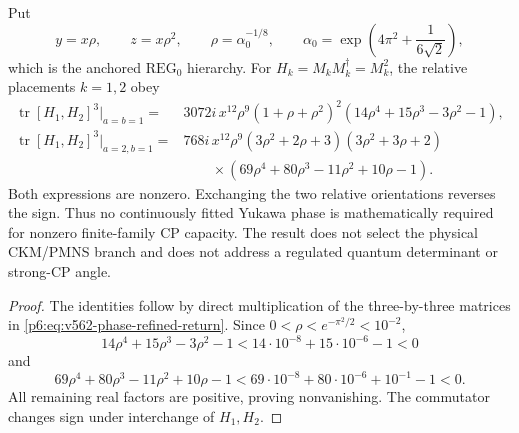 \documentclass[11pt,a4paper]{article}
\begin{document}
\begin{proposition}
\label{p6:prop:v562-discrete-cp-capacity}
Put
\[
 y=x\rho,\qquad z=x\rho^2,
\qquad \rho=\alpha_0^{-1/8},
\qquad
 \alpha_0=\exp\!\left(4\pi^2+\frac1{6\sqrt2}\right),
\]
which is the anchored \(\mathrm{REG}_0\) hierarchy.  For
\(H_k=M_kM_k^\dagger=M_k^2\), the relative placements \(k=1,2\) obey
\begin{align}
 \operatorname{tr}[H_1,H_2]^3\big|_{a=b=1}
 ={}&3072i\,x^{12}\rho^9(1+\rho+\rho^2)^2
 \left(14\rho^4+15\rho^3-3\rho^2-1\right),\label{p6:eq:v562-cp-lepton}\\
 \operatorname{tr}[H_1,H_2]^3\big|_{a=2,b=1}
 ={}&768i\,x^{12}\rho^9
 (3\rho^2+2\rho+3)(3\rho^2+3\rho+2)\nonumber\\
 &\qquad\times
 \left(69\rho^4+80\rho^3-11\rho^2+10\rho-1\right).
 \label{p6:eq:v562-cp-color}
\end{align}
Both expressions are nonzero.  Exchanging the two relative orientations
reverses the sign.  Thus no continuously fitted Yukawa phase is
mathematically required for nonzero finite-family CP capacity.  The result
does not select the physical CKM/PMNS branch and does not address a regulated
quantum determinant or strong-CP angle.
\end{proposition}
\begin{proof}
The identities follow by direct multiplication of the three-by-three
matrices in \eqref{p6:eq:v562-phase-refined-return}.  Since
\(0<\rho<e^{-\pi^2/2}<10^{-2}\),
\[
 14\rho^4+15\rho^3-3\rho^2-1<14\cdot10^{-8}+15\cdot10^{-6}-1<0
\]
and
\[
 69\rho^4+80\rho^3-11\rho^2+10\rho-1
 <69\cdot10^{-8}+80\cdot10^{-6}+10^{-1}-1<0.
\]
All remaining real factors are positive, proving nonvanishing.  The
commutator changes sign under interchange of \(H_1,H_2\).
\end{proof}
\end{document}
